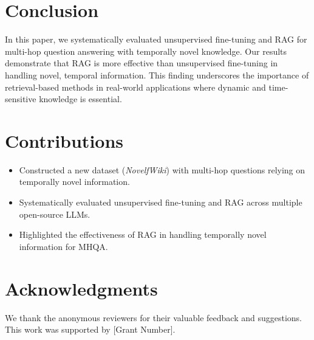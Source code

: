\documentclass[11pt]{article}
\begin{document}
\section{Conclusion}
In this paper, we systematically evaluated unsupervised fine-tuning and RAG for multi-hop question answering with temporally novel knowledge. Our results demonstrate that RAG is more effective than unsupervised fine-tuning in handling novel, temporal information. This finding underscores the importance of retrieval-based methods in real-world applications where dynamic and time-sensitive knowledge is essential.

\section{Contributions}
\begin{itemize}
  \item Constructed a new dataset (\textit{NovelfWiki}) with multi-hop questions relying on temporally novel information.
  \item Systematically evaluated unsupervised fine-tuning and RAG across multiple open-source LLMs.
  \item Highlighted the effectiveness of RAG in handling temporally novel information for MHQA.
\end{itemize}

\section*{Acknowledgments}
We thank the anonymous reviewers for their valuable feedback and suggestions. This work was supported by [Grant Number].



\end{document}
